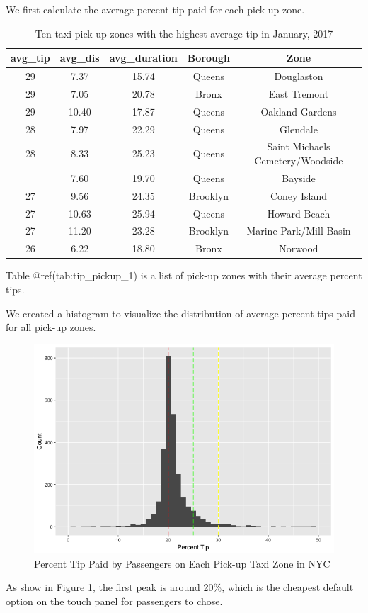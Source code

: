 \documentclass[12pt,twoside]{reedthesis}
\theoremstyle{definition}
\theoremstyle{definition}
\theoremstyle{definition}
\theoremstyle{remark}
\begin{document}
We first calculate the average percent tip paid for each pick-up zone.
\begin{table}

\caption{\label{tab:unnamed-chunk-41}Ten taxi pick-up zones with the highest average tip in January, 2017}
\centering
\begin{tabular}[t]{ccccc}
\toprule
avg\_tip & avg\_dis & avg\_duration & Borough & Zone\\
\midrule
29 & 7.37 & 15.74 & Queens & Douglaston\\
29 & 7.05 & 20.78 & Bronx & East Tremont\\
29 & 10.40 & 17.87 & Queens & Oakland Gardens\\
28 & 7.97 & 22.29 & Queens & Glendale\\
28 & 8.33 & 25.23 & Queens & Saint Michaels Cemetery/Woodside\\
\addlinespace
27 & 7.60 & 19.70 & Queens & Bayside\\
27 & 9.56 & 24.35 & Brooklyn & Coney Island\\
27 & 10.63 & 25.94 & Queens & Howard Beach\\
27 & 11.20 & 23.28 & Brooklyn & Marine Park/Mill Basin\\
26 & 6.22 & 18.80 & Bronx & Norwood\\
\bottomrule
\end{tabular}
\end{table}
Table @ref(tab:tip\_pickup\_1) is a list of pick-up zones with their
average percent tips.

We created a histogram to visualize the distribution of average percent
tips paid for all pick-up zones.
\begin{figure}

{\centering \includegraphics[width=4.77in]{figure/pickup_vis} 

}

\caption{Percent Tip Paid by Passengers on Each Pick-up Taxi Zone in NYC}\label{fig:pickup-vis}
\end{figure}
As show in Figure \ref{fig:pickup-vis}, the first peak is around 20\%,
which is the cheapest default option on the touch panel for passengers
to chose.
\end{document}
